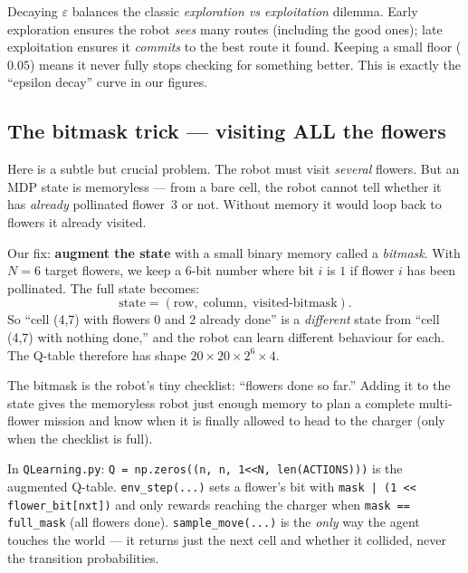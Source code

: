 \documentclass[11pt]{article}
\begin{document}
\begin{whybox}
Decaying $\varepsilon$ balances the classic \emph{exploration vs exploitation}
dilemma. Early exploration ensures the robot \emph{sees} many routes (including
the good ones); late exploitation ensures it \emph{commits} to the best route it
found. Keeping a small floor ($0.05$) means it never fully stops checking for
something better. This is exactly the ``epsilon decay'' curve in our figures.
\end{whybox}

\subsection{The bitmask trick --- visiting ALL the flowers}
Here is a subtle but crucial problem. The robot must visit \emph{several}
flowers. But an MDP state is memoryless --- from a bare cell, the robot cannot
tell whether it has \emph{already} pollinated flower~3 or not. Without memory it
would loop back to flowers it already visited.

Our fix: \textbf{augment the state} with a small binary memory called a
\emph{bitmask}. With $N=6$ target flowers, we keep a 6-bit number where bit $i$
is $1$ if flower $i$ has been pollinated. The full state becomes:
\[
\text{state} = (\text{row},\; \text{column},\; \text{visited-bitmask}).
\]
So ``cell (4,7) with flowers 0 and 2 already done'' is a \emph{different} state
from ``cell (4,7) with nothing done,'' and the robot can learn different
behaviour for each. The Q-table therefore has shape
$20 \times 20 \times 2^{6} \times 4$.

\begin{intuition}
The bitmask is the robot's tiny checklist: ``flowers done so far.'' Adding it to
the state gives the memoryless robot just enough memory to plan a complete
multi-flower mission and know when it is finally allowed to head to the charger
(only when the checklist is full).
\end{intuition}

\begin{codebox}
In \texttt{QLearning.py}: \texttt{Q = np.zeros((n, n, 1<<N, len(ACTIONS)))} is
the augmented Q-table. \texttt{env\_step(...)} sets a flower's bit with
\texttt{mask | (1 << flower\_bit[nxt])} and only rewards reaching the charger
when \texttt{mask == full\_mask} (all flowers done). \texttt{sample\_move(...)}
is the \emph{only} way the agent touches the world --- it returns just the next
cell and whether it collided, never the transition probabilities.
\end{codebox}
\end{document}
